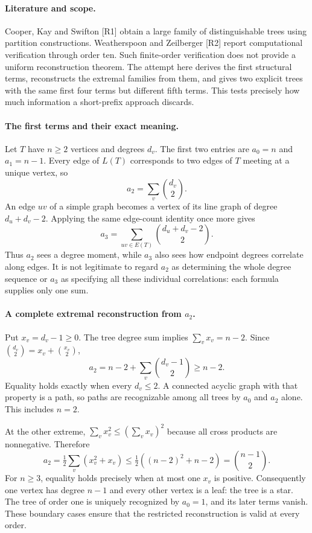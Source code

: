 \documentclass[11pt,a4paper]{article}
\begin{document}
\paragraph{Literature and scope.}
Cooper, Kay and Swifton [R1] obtain a large family of distinguishable
trees using partition constructions. Weatherspoon and Zeilberger [R2]
report computational verification through order ten. Such finite-order
verification does not provide a uniform reconstruction theorem. The
attempt here derives the first structural terms, reconstructs the
extremal families from them, and gives two explicit trees with the same
first four terms but different fifth terms. This tests precisely how
much information a short-prefix approach discards.

\paragraph{The first terms and their exact meaning.}
Let $T$ have $n\ge2$ vertices and degrees $d_v$. The first two entries
are $a_0=n$ and $a_1=n-1$. Every edge of $L(T)$ corresponds to two
edges of $T$ meeting at a unique vertex, so
\[
 a_2=\sum_v\binom{d_v}{2}.
\]
An edge $uv$ of a simple graph becomes a vertex of its line graph of
degree $d_u+d_v-2$. Applying the same edge-count identity once more gives
\[
 a_3=\sum_{uv\in E(T)}\binom{d_u+d_v-2}{2}.
\]
Thus $a_2$ sees a degree moment, while $a_3$ also sees how endpoint
degrees correlate along edges. It is not legitimate to regard $a_2$
as determining the whole degree sequence or $a_3$ as specifying all
these individual correlations: each formula supplies only one sum.

\paragraph{A complete extremal reconstruction from $a_2$.}
Put $x_v=d_v-1\ge0$. The tree degree sum implies $\sum_vx_v=n-2$.
Since $\binom{d_v}{2}=x_v+\binom{x_v}{2}$,
\[
 a_2=n-2+\sum_v\binom{d_v-1}{2}\ge n-2.
\]
Equality holds exactly when every $d_v\le2$. A connected acyclic graph
with that property is a path, so paths are recognizable among all trees
by $a_0$ and $a_2$ alone. This includes $n=2$.

At the other extreme, $\sum_vx_v^2\le(\sum_vx_v)^2$ because all cross
products are nonnegative. Therefore
\[
 a_2=\tfrac12\sum_v(x_v^2+x_v)
 \le\tfrac12((n-2)^2+n-2)=\binom{n-1}{2}.
\]
For $n\ge3$, equality holds precisely when at most one $x_v$ is
positive. Consequently one vertex has degree $n-1$ and every other
vertex is a leaf: the tree is a star. The tree of order one is uniquely
recognized by $a_0=1$, and its later terms vanish. These boundary cases
ensure that the restricted reconstruction is valid at every order.
\end{document}
